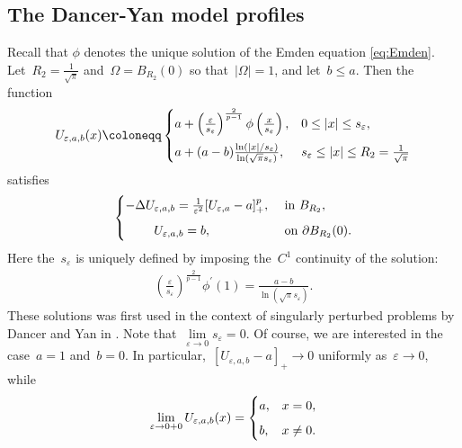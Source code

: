 \documentclass[10pt]{amsart}
\newcommand{\parenthesis}[1]{\left(#1\right)} %
\renewcommand{\to}{\rightarrow}
\begin{document}
\subsection{The Dancer-Yan model profiles}\label{subs:3.1}
Recall that $\phi$ denotes the unique solution of the Emden equation \eqref{eq:Emden}.
Let~$R_2=\frac{1}{\sqrt{\pi}}$ and~$\Omega=B_{R_2}(0)$ so that~$|\Omega|=1$, and let~$b\leq a$.
Then the function
\begin{align*}
    U_{\varepsilon,a,b}(x)\coloneqq
    \begin{cases}
        a+\parenthesis{\frac{\varepsilon}{s_\varepsilon}}^{\frac{2}{p-1}}\phi\parenthesis{\frac{x}{s_\varepsilon}}, & 0\leq |x|\leq s_\varepsilon, \vspace{2mm} \\
        a+ (a-b) \frac{\ln(|x|/s_\varepsilon)}{\ln(\sqrt{\pi}s_\varepsilon)}, & s_\varepsilon\leq |x|\leq R_2=\frac{1}{\sqrt{\pi}}
    \end{cases}
\end{align*}
satisfies
\begin{align*}
    \begin{cases}
        -\Delta U_{\varepsilon,a,b} = \frac{1}{\varepsilon^2 }[U_{\varepsilon,a}-a]_+^p, & \mbox{ in } B_{R_2}, \vspace{2mm} \\
        \qquad \; U_{\varepsilon,a,b}=b, & \mbox{ on } \partial B_{R_2}(0).
    \end{cases}
\end{align*}
Here the~$s_\varepsilon$ is uniquely defined by imposing the~$C^1$ continuity of the solution:
\begin{align}\label{eq:C1-eps}
    \parenthesis{\frac{\varepsilon}{s_\varepsilon}}^{\frac{2}{p-1}} \phi^{'}(1) = \frac{a-b}{\ln(\sqrt{\pi}s_\varepsilon)}.
\end{align}
These solutions was first used in the context of singularly perturbed problems by Dancer and Yan in \cite{DY}.
Note that~$\lim\limits_{\varepsilon\to 0} s_\varepsilon=0$. Of course, we are interested in the case~$a=1$ and~$b=0$.
In particular,~$[U_{\varepsilon,a,b}-a]_+ \to 0$ uniformly as~$\varepsilon\to 0$, while
\begin{align*}
    \lim_{\varepsilon\to0+0}U_{\varepsilon,a,b}(x)
    =\begin{cases}
        a,& x= 0, \vspace{2mm}\\
        b,& x\neq 0.
    \end{cases}
\end{align*}
\end{document}
